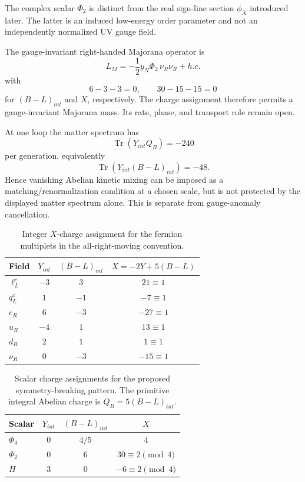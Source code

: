 \documentclass[11pt]{article}
\theoremstyle{canonmath}
\theoremstyle{canonpostulate}
\theoremstyle{canonclaim}
\def\mathrm#1{#1}%
\def\mathcal#1{#1}%
\begin{document}
The complex scalar $\Phi_2$ is distinct from the real sign-line section $\phi_X$ introduced later. The latter is an induced low-energy order parameter and not an independently normalized UV gauge field.

The gauge-invariant right-handed Majorana operator is
\begin{equation}
\mathcal L_M=-\frac12y_N\Phi_2\,\nu_R\nu_R+\mathrm{h.c.}
\label{eq:majorana}
\end{equation}
with
\begin{equation}
6-3-3=0,
\qquad
30-15-15=0
\end{equation}
for $(B-L)_{\mathrm{int}}$ and $X$, respectively. The charge assignment therefore permits a gauge-invariant Majorana mass. Its rate, phase, and transport role remain open.

At one loop the matter spectrum has
\begin{equation}
\operatorname{Tr}(Y_{\mathrm{int}}Q_B)=-240
\end{equation}
per generation, equivalently
\begin{equation}
\operatorname{Tr}\!\left(Y_{\mathrm{int}}(B-L)_{\mathrm{int}}\right)=-48.
\end{equation}
Hence vanishing Abelian kinetic mixing can be imposed as a matching/renormalization condition at a chosen scale, but is not protected by the displayed matter spectrum alone. This is separate from gauge-anomaly cancellation.

\begin{table}[H]
\centering
\caption{Integer $X$-charge assignment for the fermion multiplets in the all-right-moving convention.}
\label{tab:charges}
\begin{tabular}{@{}lccc@{}}
\toprule
\textbf{Field} & $Y_{\mathrm{int}}$ & $(B-L)_{\mathrm{int}}$ & $X=-2Y+5(B-L)$ \\
\midrule
$\ell_L^c$ & $-3$ & $3$ & $21 \equiv 1$ \\
$q_L^c$ & $1$ & $-1$ & $-7 \equiv 1$ \\
$e_R$ & $6$ & $-3$ & $-27 \equiv 1$ \\
$u_R$ & $-4$ & $1$ & $13 \equiv 1$ \\
$d_R$ & $2$ & $1$ & $1 \equiv 1$ \\
$\nu_R$ & $0$ & $-3$ & $-15 \equiv 1$ \\
\bottomrule
\end{tabular}
\end{table}

\begin{table}[H]
\centering
\caption{Scalar charge assignments for the proposed symmetry-breaking pattern. The primitive integral Abelian charge is $Q_B=5(B-L)_{\mathrm{int}}$.}
\begin{tabular}{@{}lccc@{}}
\toprule
\textbf{Scalar} & $Y_{\mathrm{int}}$ & $(B-L)_{\mathrm{int}}$ & $X$ \\
\midrule
$\Phi_4$ & $0$ & $4/5$ & $4$ \\
$\Phi_2$ & $0$ & $6$ & $30 \equiv 2 \pmod 4$ \\
$H$ & $3$ & $0$ & $-6 \equiv 2 \pmod 4$ \\
\bottomrule
\end{tabular}
\end{table}
\end{document}
